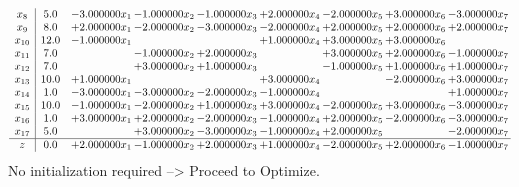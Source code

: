 \documentclass[10pt]{article}
\begin{document}
\[\begin{array}{c| c c@{\hskip 2pt} c@{\hskip 2pt} c@{\hskip 2pt} c@{\hskip 2pt} c@{\hskip 2pt} c@{\hskip 2pt} c@{\hskip 2pt} }
 x_{8}   &  5.0 & -3.000000 x_{1} & -1.000000 x_{2} & -1.000000 x_{3} & + 2.000000 x_{4} & -2.000000 x_{5} & + 3.000000 x_{6} & -3.000000 x_{7}\\
 x_{9}   &  8.0 & + 2.000000 x_{1} & -2.000000 x_{2} & -3.000000 x_{3} & -2.000000 x_{4} & + 2.000000 x_{5} & + 2.000000 x_{6} & + 2.000000 x_{7}\\
 x_{10}   &  12.0 & -1.000000 x_{1} &    &   & + 1.000000 x_{4} & + 3.000000 x_{5} & + 3.000000 x_{6} &   \\
 x_{11}   &  7.0  &   & -1.000000 x_{2} & + 2.000000 x_{3} &   & + 3.000000 x_{5} & + 2.000000 x_{6} & -1.000000 x_{7}\\
 x_{12}   &  7.0  &   & + 3.000000 x_{2} & + 1.000000 x_{3} &   & -1.000000 x_{5} & + 1.000000 x_{6} & + 1.000000 x_{7}\\
 x_{13}   &  10.0 & + 1.000000 x_{1} &    &   & + 3.000000 x_{4} &   & -2.000000 x_{6} & + 3.000000 x_{7}\\
 x_{14}   &  1.0 & -3.000000 x_{1} & -3.000000 x_{2} & -2.000000 x_{3} & -1.000000 x_{4} &    &   & + 1.000000 x_{7}\\
 x_{15}   &  10.0 & -1.000000 x_{1} & -2.000000 x_{2} & + 1.000000 x_{3} & + 3.000000 x_{4} & -2.000000 x_{5} & + 3.000000 x_{6} & -3.000000 x_{7}\\
 x_{16}   &  1.0 & + 3.000000 x_{1} & + 2.000000 x_{2} & -2.000000 x_{3} & -1.000000 x_{4} & + 2.000000 x_{5} & -2.000000 x_{6} & -3.000000 x_{7}\\
 x_{17}   &  5.0  &   & + 3.000000 x_{2} & -3.000000 x_{3} & -1.000000 x_{4} & + 2.000000 x_{5} &   & -2.000000 x_{7}\\
\hline
z    &  0.0 & + 2.000000 x_{1} & -1.000000 x_{2} & + 2.000000 x_{3} & + 1.000000 x_{4} & -2.000000 x_{5} & + 2.000000 x_{6} & -1.000000 x_{7}\\
\end{array}\]
No initialization required --> Proceed to Optimize. 
\end{document}
